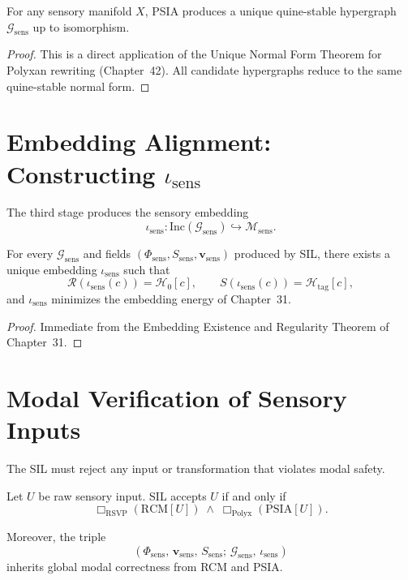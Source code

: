 \begin{theorem}\label{thm:46-psia-uniqueness}
For any sensory manifold $X$, PSIA produces a unique quine-stable hypergraph $\mathcal{G}_{\mathrm{sens}}$ up to isomorphism.
\end{theorem}

\begin{proof}
This is a direct application of the Unique Normal Form Theorem for Polyxan rewriting (Chapter~42).  
All candidate hypergraphs reduce to the same quine-stable normal form.  
\end{proof}

\section{Embedding Alignment: Constructing $\iota_{\mathrm{sens}}$}

The third stage produces the sensory embedding
\[
\iota_{\mathrm{sens}} : 
\mathrm{Inc}(\mathcal{G}_{\mathrm{sens}})
\hookrightarrow
\mathcal{M}_{\mathrm{sens}}.
\]

\begin{theorem}\label{thm:46-embed}
For every $\mathcal{G}_{\mathrm{sens}}$ and fields $(\Phi_{\mathrm{sens}}, S_{\mathrm{sens}}, \mathbf{v}_{\mathrm{sens}})$ produced by SIL, there exists a unique embedding $\iota_{\mathrm{sens}}$ such that
\[
\mathcal{R}(\iota_{\mathrm{sens}}(c)) = \mathcal{H}_0[c],
\qquad
S(\iota_{\mathrm{sens}}(c)) = \mathcal{H}_{\mathrm{tag}}[c],
\]
and $\iota_{\mathrm{sens}}$ minimizes the embedding energy of Chapter~31.
\end{theorem}

\begin{proof}
Immediate from the Embedding Existence and Regularity Theorem of Chapter~31.  
\end{proof}

\section{Modal Verification of Sensory Inputs}

The SIL must reject any input or transformation that violates modal safety.

\begin{theorem}\label{thm:46-modal}
Let $U$ be raw sensory input.  
SIL accepts $U$ if and only if
\[
\Box_{\mathrm{RSVP}}(\mathrm{RCM}[U])
\;\wedge\;
\Box_{\mathrm{Polyx}}(\mathrm{PSIA}[U]).
\]

Moreover, the triple
\[
(\Phi_{\mathrm{sens}},\, \mathbf{v}_{\mathrm{sens}},\, S_{\mathrm{sens}};\,
\mathcal{G}_{\mathrm{sens}},\,\iota_{\mathrm{sens}})
\]
inherits global modal correctness from RCM and PSIA.
\end{theorem}

